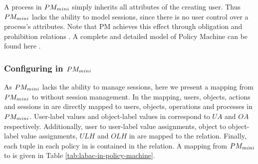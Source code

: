 

A process in $PM_{mini}{}$ simply inherits all attributes of the creating user. Thus $PM_{mini}{}$ lacks the ability to model sessions, since there is no user control over a process's attributes.  Note that PM achieves this effect through obligation and prohibition relations \cite{INCITS526}. A complete and detailed model of Policy Machine can be found here \cite{INCITS526,policy-machine}.


 \subsubsection{Configuring \hlabac{} in $PM_{mini}{}$}
 
 
 
As $PM_{mini}{}$ lacks the ability to manage sessions, here we present a mapping from $PM_{mini}{}$ to \hlabac{} without session management. In the mapping, users, objects, actions and sessions in \eapABAC{} are directly mapped to users, objects, operations and processes in $PM_{mini}{}$.  User-label values and object-label values in \eapABAC{} correspond to $UA$ and $OA$ respectively. Additionally,  user to user-label value assignments, object to object-label value assignments,  $ULH$ and $OLH$ in \hlabac{} are mapped to the \assignment{} relation. Finally, each tuple in each policy in \eapABAC{} is contained in the \association{} relation. A mapping from  $PM_{mini}{}$ to \hlabac{} is given in Table \ref{tab:labac-in-policy-machine}. 

